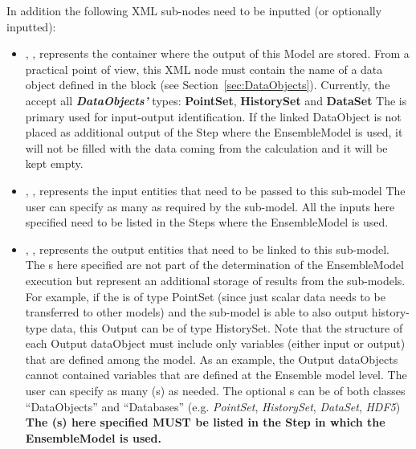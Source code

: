 \begin{itemize}
  In addition the following XML sub-nodes need to be inputted (or optionally inputted):
  \begin{itemize}
     \item {}, ,
        represents the container where the output of this Model are stored.
        From a practical point of view, this XML node must contain the name of
        a data object defined in the  block (see
        Section~\ref{sec:DataObjects}).
        Currently, the   accept all \textbf{\textit{DataObjects'}}  types:
        \textbf{PointSet},  \textbf{HistorySet} and \textbf{DataSet}
        \nb The   is primary used for input-output identification. If the linked
        DataObject is not placed as additional output of the Step where the EnsembleModel is used, it will
        not be filled with the data coming from the calculation and it will be kept empty.
     \item {}, ,
        represents the input entities that need to be passed to this sub-model
        The user can specify as many  as required by the sub-model.
        \nb All the inputs here specified need to be listed in the Steps where the EnsembleModel
        is used.
     \item {}, ,
        represents the output entities that need to be linked to this sub-model.  \nb The s here
        specified are not part
        of the determination of the EnsembleModel execution but represent an additional storage of results from the
        sub-models. For example, if the  is of type PointSet (since just scalar data needs to
        be transferred to other
        models) and the sub-model is able to also output history-type data, this Output can be of type HistorySet.
        Note that the structure of each Output dataObject must include only variables (either input or output) that are
        defined among the model.
        As an example, the Output dataObjects cannot contained variables that are defined at the Ensemble model
        level.
        The user can specify as many  (s) as needed. The optional s  can be of
        both classes ``DataObjects'' and ``Databases''
        (e.g. \textit{PointSet}, \textit{HistorySet}, \textit{DataSet}, \textit{HDF5})
        \nb \textbf{The  (s) here specified MUST be listed in the Step in which the EnsembleModel is used.}
    \end{itemize}
\end{itemize}


